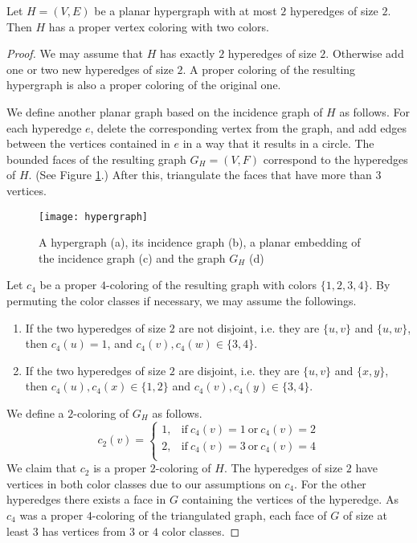 \begin{thm} \label{thm:hyper}
  Let $H = (V, E)$ be a planar hypergraph with at most $2$ hyperedges of size $2$. Then $H$ has
  a proper vertex coloring with two colors.
\end{thm}
\begin{proof}
  We may assume that $H$ has exactly $2$ hyperedges of size $2$. Otherwise add
  one or two new hyperedges of size $2$. A proper coloring of the resulting hypergraph
  is also a proper coloring of the original one.

  We define another planar graph based on the incidence graph of $H$ as follows.
  For each hyperedge $e$, delete the corresponding vertex from the graph, and
  add edges between the vertices contained in $e$ in a way that it results in a circle.
  The bounded faces of the resulting graph $G_H=(V, F)$ correspond to the hyperedges of $H$.
  (See Figure \ref{fig:hyper}.) After this, triangulate the faces that have more than
  $3$ vertices.

  \begin{figure}[h]
    \centering
    \texttt{[image: hypergraph]}
    \caption{A hypergraph (a), its incidence graph (b), a planar embedding of the
      incidence graph (c) and the graph $G_H$ (d)}
    \label{fig:hyper}
  \end{figure}

  Let $c_4$ be a proper $4$-coloring of the resulting graph with colors $\{1, 2, 3, 4\}$.
  By permuting the color classes if necessary, we may assume the followings.
  \begin{enumerate}
    \item If the two hyperedges of size $2$ are not disjoint, i.e. they are $\{u, v\}$ and
      $\{u, w\}$, then $c_4(u) = 1$, and $c_4(v), c_4(w) \in \{3, 4\}$.
    \item If the two hyperedges of size $2$ are disjoint, i.e. they are $\{u, v\}$ and
      $\{x, y\}$, then $c_4(u), c_4(x) \in \{1, 2\}$ and $c_4(v), c_4(y) \in \{3, 4\}$.
  \end{enumerate}
  We define a $2$-coloring of $G_H$ as follows.
  \[
    c_2(v) = \begin{cases}
      1, & \text{if}\ c_4(v) = 1 \ \text{or}\ c_4(v) = 2\\
      2, & \text{if}\ c_4(v) = 3 \ \text{or}\ c_4(v) = 4\\
    \end{cases}
  \]
  We claim that $c_2$ is a proper $2$-coloring of $H$. The hyperedges of size $2$
  have vertices in both color classes due to our assumptions on $c_4$. For the other
  hyperedges there exists a face in $G$ containing the vertices of the hyperedge.
  As $c_4$ was a proper $4$-coloring of the triangulated graph, each face of $G$
  of size at least $3$ has vertices from $3$ or $4$ color classes.
\end{proof}


